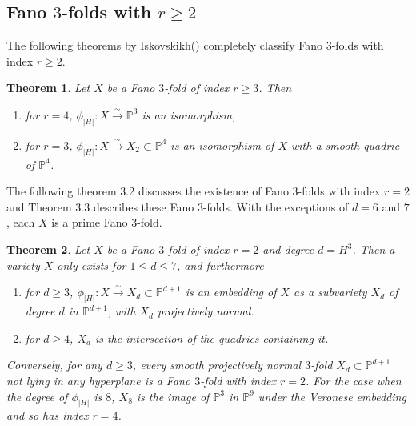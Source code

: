 \documentclass[11pt]{amsart}
\theoremstyle{plain}
\newtheorem{theorem}{Theorem}[section]
\theoremstyle{definition}
\theoremstyle{expl}
\begin{document}
\subsection{Fano $3$-folds with $r\geq2$}
The following theorems by Iskovskikh(\cite{Isk77}) completely classify Fano $3$-folds with index $r\geq 2$. 
\begin{theorem}
Let $X$ be a Fano $3$-fold of index $r\geq 3$. Then
\begin{enumerate}
\item[(i)] for $r =4$, $\phi_{|H|}: X \xrightarrow{\sim} \mathbb{P}^3$ is an isomorphism,
\item[(ii)] for $r=3$, $\phi_{|H|}: X \xrightarrow{\sim} X_2\subset \mathbb{P}^4$ is an isomorphism of $X$ with a smooth quadric of $\mathbb{P}^4$.
\end{enumerate}
\end{theorem}
The following theorem 3.2 discusses the existence of Fano $3$-folds with index $r=2$ and Theorem 3.3 describes these Fano $3$-folds. With the exceptions of $d=6$ and $7$, each $X$ is a prime Fano $3$-fold.  
\begin{theorem} Let $X$ be a Fano $3$-fold of index $r=2$ and degree $d=H^3$. Then 
        a variety $X$ only exists for $1\leq d \leq 7$, and furthermore
        \begin{enumerate}
        \item[(i)] for $d\geq 3$, $\phi_{|H|}: X \xrightarrow{\sim}X_d \subset \mathbb{P}^{d+1}$ is an embedding of $X$ as a subvariety $X_d$ of degree $d$ in $\mathbb{P}^{d+1}$, with $X_d$ projectively normal.
        \item[(ii)] for $d\geq 4$, $X_d$ is the intersection of the quadrics containing it.
        \end{enumerate} 
        Conversely, for any $d\geq 3$, every smooth projectively normal $3$-fold $X_d \subset \mathbb{P}^{d+1}$ not lying in any hyperplane is a Fano $3$-fold with index $r=2$. For the case when the degree of $\phi_{|H|}$ is $8$, $X_8$ is the image of $\mathbb{P}^3$ in $\mathbb{P}^9$ under the Veronese embedding and so has index $r =4$.
\end{theorem}
\end{document}
